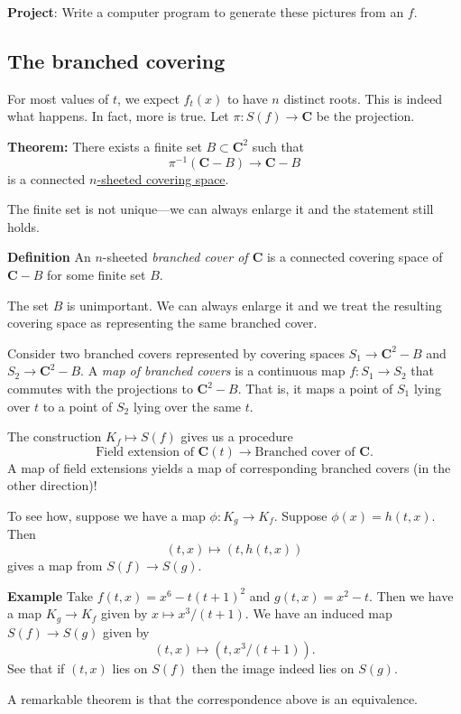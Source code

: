 \documentclass[11pt]{article}
\begin{document}
\textbf{\textbf{Project}}: Write a computer program to generate these pictures from an \(f\).
\subsection{The branched covering}
\label{sec:orgd194db9}
For most values of \(t\), we expect \(f_t(x)\) to have \(n\) distinct roots.
This is indeed what happens.
In fact, more is true.
Let \(\pi \colon S(f) \to \mathbf{C}\) be the projection.

\textbf{\textbf{Theorem:}} There exists a finite set \(B \subset \mathbf{C}^2\) such that 
\[ \pi^{-1}(\mathbf{C} -B) \to \mathbf{C}-B\]
is a connected \href{https://en.wikipedia.org/wiki/Covering\_space}{\(n\)-sheeted covering space}.

The finite set is not unique---we can always enlarge it and the statement still holds.

\textbf{\textbf{Definition}} An \(n\)-sheeted \emph{branched cover of \(\mathbf{C}\)} is a connected covering space of \(\mathbf{C} - B\) for some finite set \(B\).

The set \(B\) is unimportant.
We can always enlarge it and we treat the resulting covering space as representing the same branched cover.

Consider two branched covers represented by covering spaces \(S_1 \to \mathbf{C}^2-B\) and \(S_2 \to \mathbf{C}^2-B\).
A \emph{map of branched covers} is a continuous map \(f \colon S_1 \to S_2\) that commutes with the projections to \(\mathbf{C}^2-B\).
That is, it maps a point of \(S_1\) lying over \(t\) to a point of \(S_2\) lying over the same \(t\).

The construction \(K_f \mapsto S(f)\) gives us a procedure
\[ \text{Field extension of } \mathbf{C}(t)  \to \text{Branched cover of } \mathbf{C}.\]
A map of field extensions yields a map of corresponding branched covers (in the other direction)!

To see how, suppose we have a map \(\phi \colon K_g \to K_f\).
Suppose \(\phi(x) = h(t,x)\).
Then
\[ (t,x) \mapsto (t, h(t,x))\]
gives a map from \(S(f) \to S(g)\).

\textbf{\textbf{Example}}
Take \(f(t,x) = x^6-t(t+1)^{2}\) and \(g(t,x) = x^2 - t\).
Then we have a map \(K_g \to K_f\) given by \(x \mapsto x^3/(t+1)\).
We have an induced map \(S(f) \to S(g)\) given by
\[ (t,x) \mapsto (t,x^3/(t+1)).\]
See that if \((t,x)\) lies on \(S(f)\) then the image indeed lies on \(S(g)\).

A remarkable theorem is that the correspondence above is an equivalence.
\end{document}
